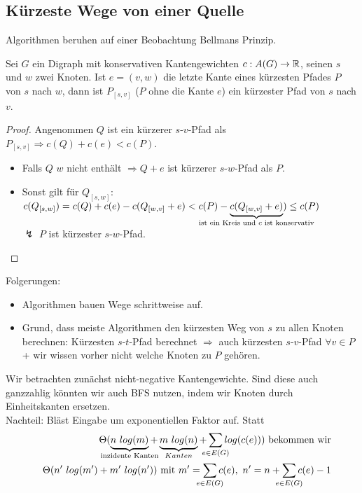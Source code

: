 \subsection{Kürzeste Wege von einer Quelle}
Algorithmen beruhen auf einer Beobachtung \dq Bellmans Prinzip\dq.
\begin{lemma}
	Sei $G$ ein Digraph mit konservativen Kantengewichten $c:A(G)\to \mathbb{R}$, seinen $s$ und $w$ zwei Knoten. Ist $e=(v,w)$ die letzte Kante eines kürzesten Pfades $P$ von $s$ nach $w$, dann ist $P_{[s,v]}$ ($P$ ohne die Kante $e$) ein kürzester Pfad von $s$ nach $v$.
\end{lemma}
\begin{proof}
	Angenommen $Q$ ist ein kürzerer $s$-$v$-Pfad als $P_{[s,v]} \Rightarrow c(Q) + c(e) < c(P)$.
	\begin{itemize}
		\item Falls $Q$ $w$ nicht enthält $\Rightarrow Q + e$ ist kürzerer $s$-$w$-Pfad als $P$.
		\item Sonst gilt für $Q_{[s,w]}$:\\ $c(Q_{[s,w]}) = c(Q) + c(e) - c(Q_{[w,v]} + e) < c(P) - \underbrace{c(Q_{[w,v]} + e)}_{\mathclap{\text{ist ein Kreis und $c$ ist konservativ}}}) \le c(P)$\\ $\lightning$ $P$ ist kürzester $s$-$w$-Pfad.
	\end{itemize}
\end{proof}
Folgerungen:
\begin{itemize}
	\item Algorithmen bauen Wege schrittweise auf.
	\item Grund, dass meiste Algorithmen den kürzesten Weg von $s$ zu allen Knoten berechnen: Kürzesten $s$-$t$-Pfad berechnet $\Rightarrow$ auch kürzesten $s$-$v$-Pfad $\forall v\in P$ + wir wissen vorher nicht welche Knoten zu $P$ gehören.
\end{itemize}
Wir betrachten zunächst nicht-negative Kantengewichte. Sind diese auch ganzzahlig könnten wir auch BFS nutzen, indem wir Knoten durch Einheitskanten ersetzen.\\
Nachteil: Bläst Eingabe um exponentiellen Faktor auf. Statt
\begin{eqnarray*}
	&&\Theta(\underbrace{n~log(m)}_{\mathclap{\text{inzidente Kanten}}} + \underbrace{m~log(n)}_{Kanten} + \sum_{\mathclap{e \in E(G)}} log(c(e))) \text{ bekommen wir}\\
	&&\Theta(n'~log(m') + m'~log(n')) \text{ mit } m' = \sum_{\mathclap{e \in E(G)}} c(e),~n' = n + \sum_{\mathclap{e \in E(G)}} c(e) - 1
\end{eqnarray*}
